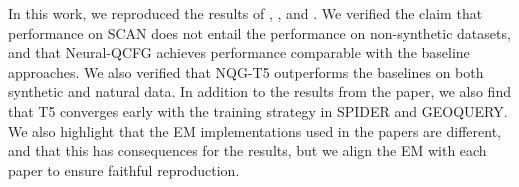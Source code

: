 In this work, we reproduced the results of \cite{shaw-etal-2021-compositional}, \cite{kim2021sequencetosequence}, and \cite{kim-linzen-2020-cogs}.
We verified the claim that performance on SCAN does not entail the performance on non-synthetic datasets, and that Neural-QCFG achieves performance comparable with the baseline approaches. 
We also verified that NQG-T5 outperforms the baselines on both synthetic and natural data.
In addition to the results from the paper, we also find that T5 converges early with the training strategy in SPIDER and GEOQUERY.
We also highlight that the EM implementations used in the papers are different, and that this has consequences for the results, but we align the EM with each paper to ensure faithful reproduction.